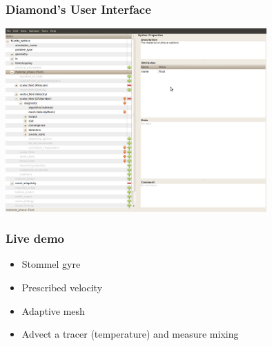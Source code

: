 \documentclass[12pt]{beamer}
\begin{document}
\begin{frame}
    \frametitle{Diamond's User Interface}
\begin{center} 
\includegraphics[width=0.75\textwidth]{images/diamond.png} 
\end{center} 
\end{frame}

\begin{frame}
    \frametitle{Live demo}
\begin{itemize}
    \item Stommel gyre
    \item Prescribed velocity
    \item Adaptive mesh
    \item Advect a tracer (temperature) and measure mixing
\end{itemize}
\end{frame}
\end{document}
